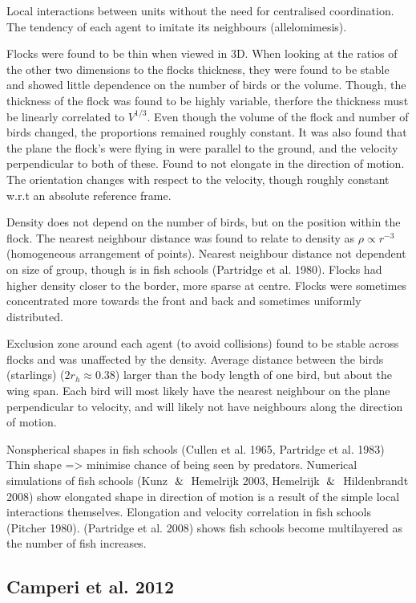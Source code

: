 \documentclass[10pt,twocolumn]{revtex4-2}    %
\begin{document}
Local interactions between units without the need for centralised coordination. The tendency of each agent to imitate its neighbours (allelomimesis).

Flocks were found to be thin when viewed in 3D. When looking at the ratios of the other two dimensions to the flocks thickness, they were found to be stable and showed little dependence on the number of birds or the volume. Though, the thickness of the flock was found to be highly variable, therfore the thickness must be linearly correlated to $V^{1/3}$. Even though the volume of the flock and number of birds changed, the proportions remained roughly constant. It was also found that the plane the flock's were flying in were parallel to the ground, and the velocity perpendicular to both of these. Found to not elongate in the direction of motion. The orientation changes with respect to the velocity, though roughly constant w.r.t an absolute reference frame.

Density does not depend on the number of birds, but on the position within the flock. The nearest neighbour distance was found to relate to density as $\rho \propto r^{-3}$ (homogeneous arrangement of points). Nearest neighbour distance not dependent on size of group, though is in fish schools (Partridge et al. 1980). Flocks had higher density closer to the border, more sparse at centre. Flocks were sometimes concentrated more towards the front and back and sometimes uniformly distributed. 

Exclusion zone around each agent (to avoid collisions) found to be stable across flocks and was unaffected by the density. Average distance between the birds (starlings) ($2r_h \approx 0.38$) larger than the body length of one bird, but about the wing span. Each bird will most likely have the nearest neighbour on the plane perpendicular to velocity, and will likely not have neighbours along the direction of motion. 

Nonspherical shapes in fish schools (Cullen et al. 1965, Partridge et al. 1983) Thin shape => minimise chance of being seen by predators. Numerical simulations of fish schools (Kunz $\And$ Hemelrijk 2003, Hemelrijk $\And$ Hildenbrandt 2008) show elongated shape in direction of motion is a result of the simple local interactions themselves. Elongation and velocity correlation in fish schools (Pitcher 1980). (Partridge et al. 2008) shows fish schools become multilayered as the number of fish increases.


\subsection{Camperi et al. 2012}
\end{document}
